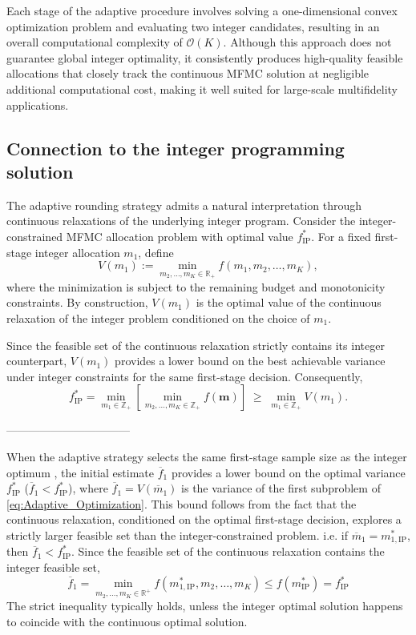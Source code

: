 Each stage of the adaptive procedure involves solving a one-dimensional convex optimization problem and evaluating two integer candidates, resulting in an overall computational complexity of $\mathcal{O}(K)$. Although this approach does not guarantee global integer optimality, it consistently produces high-quality feasible allocations that closely track the continuous MFMC solution at negligible additional computational cost, making it well suited for large-scale multifidelity applications.

\subsection{Connection to the integer programming solution}

The adaptive rounding strategy admits a natural interpretation through continuous relaxations of the underlying integer program. Consider the integer-constrained MFMC allocation problem with optimal value $f_{\mathrm{IP}}^*$. For a fixed first-stage integer allocation $m_1$, define
\[
V(m_1) := \min_{m_2,\ldots,m_K \in \mathbb{R}_+} f(m_1,m_2,\ldots,m_K),
\]
where the minimization is subject to the remaining budget and monotonicity constraints. By construction, $V(m_1)$ is the optimal value of the continuous relaxation of the integer problem conditioned on the choice of $m_1$.

Since the feasible set of the continuous relaxation strictly contains its integer counterpart, $V(m_1)$ provides a lower bound on the best achievable variance under integer constraints for the same first-stage decision. Consequently,
\[
f_{\mathrm{IP}}^*
= \min_{m_1 \in \mathbb{Z}_+} \left[ \min_{m_2,\ldots,m_K \in \mathbb{Z}_+} f(\mathbf{m}) \right]
\;\ge\;
\min_{m_1 \in \mathbb{Z}_+} V(m_1).
\]


---------------------------------


When the adaptive strategy selects the same first-stage sample size as the integer optimum , the initial estimate $\overline{f}_1$ provides a lower bound on the optimal variance $f_{\text{IP}}^*$ ($\overline{f}_1<f_{\text{IP}}^*$), where $\overline{f}_1=V(\overline{m}_1)$ is the variance of the first subproblem of \eqref{eq:Adaptive_Optimization}. This bound follows from the fact that the continuous relaxation, conditioned on the optimal first-stage decision, explores a strictly larger feasible set than the integer-constrained problem. i.e. if $\overline{m}_1 = m_{1,\text{IP}}^*$, then $\overline{f}_1<f_{\text{IP}}^*$. Since the feasible set of the continuous relaxation contains the integer feasible set,
\[
\overline{f}_1=\min_{m_2,\ldots, m_K\in \mathbb{R}^+}f(m_{1,\text{IP}}^*, m_2, \ldots, m_K)\le f(m_{\text{IP}}^*) = f_{\text{IP}}^*
\]
The strict inequality typically holds, unless the integer optimal solution happens to coincide with the continuous optimal solution.

